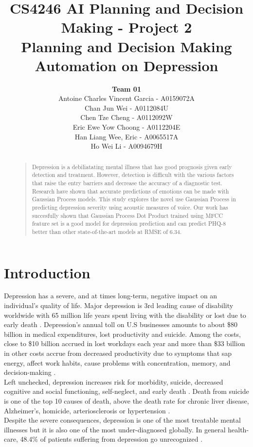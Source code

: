 \documentclass{article}
\title{
	CS4246 AI Planning and Decision Making - Project 2 \\
	Planning and Decision Making Automation on Depression
}
\author{
	{\bf Team 01} \\
	Antoine Charles Vincent Garcia - A0159072A\\
	Chan Jun Wei - A0112084U\\
	Chen Tze Cheng - A0112092W\\
	Eric Ewe Yow Choong - A0112204E\\
	Han Liang Wee, Eric - A0065517A\\
	Ho Wei Li - A0094679H\\
}
\begin{document}
 	\maketitle

	\begin{abstract}
	\begin{quote}
	Depression is a debiliatating mental illness that has good prognosis given early detection and treatment. 
	However, detection is difficult with the various factors that raise the entry barriers and decrease the accuracy of a diagnostic test. Research have shown that accurate predictions of emotions can be made with Gaussian Process models. 
	This study explores the novel use Gaussian Process in predicting depression severity using acoustic measures of voice.
	Our work has succesfully shown that Gaussian Process Dot Product trained using MFCC feature set is a good model for depression prediction and can predict PHQ-8 better than other state-of-the-art models at RMSE of 6.34.\\
	\end{quote}
	\end{abstract}
	
	\section{Introduction}
	Depression has a severe, and at times long-term, negative impact on an individual's quality of life. 
	Major depression is 3rd leading cause of disability worldwide with 65 million life years spent living with the disability or lost due to early death \cite{who2004}.
	Depression's annual toll on U.S businesses amounts to about \$80 billion in medical expenditures, lost productivity and suicide. 
	Among the costs, close to \$10 billion accrued in lost workdays each year and more than \$33 billion in other costs accrue from decreased productivity due to symptoms that sap energy, affect work habits, cause problems with concentration, memory, and decision-making \cite{tjcp2015}. \\

	Left unchecked, depression increases risk for morbidity, suicide, decreased cognitive and social functioning, self-neglect, and early death \cite{arcp2009}. 
	Death from suicide is one of the top 10 causes of death, above the death rate for chronic liver disease, Alzheimer's, homicide, arteriosclerosis or hypertension \cite{nvsr2016}. \\

	Despite the severe consequences, depression is one of the most treatable mental illnesses but it is also one of the most under-diagnosed globally. 
	In general health-care, 48.4\% of patients suffering from depression go unrecognized \cite{jama2003}.
\end{document}

